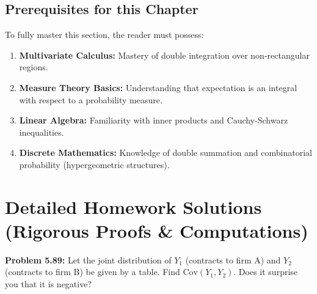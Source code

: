 \documentclass[11pt, a4paper]{article}
\theoremstyle{definition}
\theoremstyle{remark}
\newcommand{\Cov}{\mathrm{Cov}}
\begin{document}
\subsection{Prerequisites for this Chapter}
To fully master this section, the reader must possess:
\begin{enumerate}
    \item \textbf{Multivariate Calculus:} Mastery of double integration over non-rectangular regions.
    \item \textbf{Measure Theory Basics:} Understanding that expectation is an integral with respect to a probability measure.
    \item \textbf{Linear Algebra:} Familiarity with inner products and Cauchy-Schwarz inequalities.
    \item \textbf{Discrete Mathematics:} Knowledge of double summation and combinatorial probability (hypergeometric structures).
\end{enumerate}

\newpage
\section{Detailed Homework Solutions (Rigorous Proofs \& Computations)}

\vspace{1em}
\noindent\textbf{Problem 5.89:} Let the joint distribution of $Y_1$ (contracts to firm A) and $Y_2$ (contracts to firm B) be given by a table. Find $\Cov(Y_1, Y_2)$. Does it surprise you that it is negative?
\end{document}
